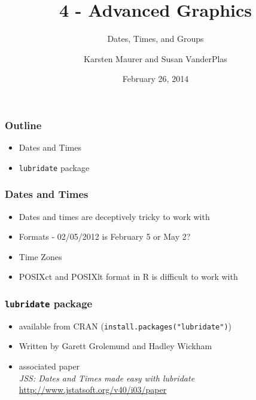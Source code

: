 \documentclass{beamer}\usepackage[]{graphicx}\usepackage[]{color}
\title[ 4-Graphics]{4 - Advanced Graphics}
\subtitle{Dates, Times, and Groups}
\author[ K. Maurer, S. VanderPlas]{Karsten Maurer and Susan VanderPlas}
\date{February 26, 2014}
\institute[ISU]{Iowa State University}
\begin{document}
\begin{frame}
\maketitle
\end{frame}




\begin{frame}
\frametitle{Outline}
\begin{itemize}
\item Dates and Times
\item \texttt{lubridate} package
\end{itemize}
\end{frame}


\begin{frame}
\frametitle{Dates and Times}
\begin{itemize}
\item Dates and times are deceptively tricky to work with\medskip
\item Formats - 02/05/2012 is February 5 or May 2? \medskip
\item Time Zones\medskip
\item POSIXct and POSIXlt format in R is difficult to work with
\end{itemize}
\end{frame}

\begin{frame}
\frametitle{\texttt{lubridate} package}
\begin{itemize}
\item available from CRAN (\texttt{install.packages("lubridate")})\medskip
\item Written by Garett Grolemund and Hadley Wickham\medskip
\item associated paper\\\emph{JSS: Dates and Times made easy with lubridate}\\\url{http://www.jstatsoft.org/v40/i03/paper
}
\end{itemize}
\end{frame}
\end{document}
